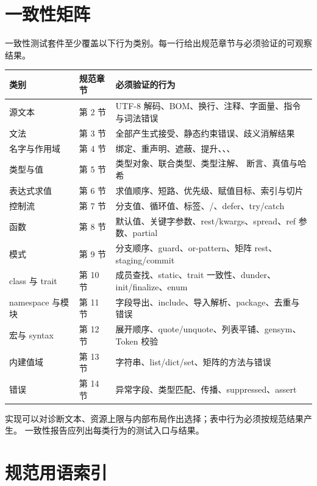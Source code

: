 \documentclass[UTF8,12pt]{ctexart}
\newcommand{\jc}[1]{\texttt{\detokenize{#1}}}
\begin{document}
\section{一致性矩阵}

一致性测试套件至少覆盖以下行为类别。每一行给出规范章节与必须验证的可观察结果。

\begin{center}
\begin{longtable}{@{}p{2.5cm}p{4.0cm}p{7.2cm}@{}}
\toprule
类别 & 规范章节 & 必须验证的行为 \\
\midrule
源文本 & 第 2 节 & UTF-8 解码、BOM、换行、注释、字面量、指令与词法错误 \\
文法 & 第 3 节 & 全部产生式接受、静态约束错误、歧义消解结果 \\
名字与作用域 & 第 4 节 & 绑定、重声明、遮蔽、提升、\jc{ref}、\jc{state}、\jc{const} \\
类型与值 & 第 5 节 & 类型对象、联合类型、类型注解、\jc{as} 断言、真值与哈希 \\
表达式求值 & 第 6 节 & 求值顺序、短路、优先级、赋值目标、索引与切片 \\
控制流 & 第 7 节 & 分支值、循环值、标签、\jc{break}/\jc{continue}、defer、try/catch \\
函数 & 第 8 节 & 默认值、关键字参数、rest/kwargs、spread、ref 参数、partial \\
模式 & 第 9 节 & 分支顺序、guard、or-pattern、矩阵 rest、staging/commit \\
class 与 trait & 第 10 节 & 成员查找、static、trait 一致性、dunder、init/finalize、enum \\
namespace 与模块 & 第 11 节 & 字段导出、include、导入解析、package、去重与错误 \\
宏与 syntax & 第 12 节 & 展开顺序、quote/unquote、列表平铺、gensym、Token 校验 \\
内建值域 & 第 13 节 & 字符串、list/dict/set、矩阵的方法与错误 \\
错误 & 第 14 节 & 异常字段、类型匹配、传播、suppressed、assert \\
\bottomrule
\end{longtable}
\end{center}

实现可以对诊断文本、资源上限与内部布局作出选择；表中行为必须按规范结果产生。
一致性报告应列出每类行为的测试入口与结果。

\section{规范用语索引}
\end{document}
